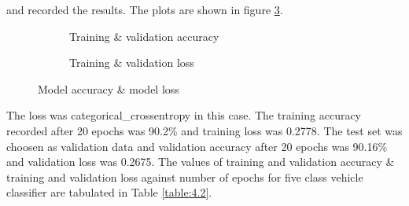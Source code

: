 and recorded the results. The plots are shown in
figure \ref{fig:4.6}.
\begin{figure}[htbp]
    \centering
    \begin{subfigure}[t]{0.45\textwidth}
        \caption{Training \& validation accuracy}
        \label{fig:4.4a}
    \end{subfigure}
    \begin{subfigure}[t]{0.45\textwidth}
        \caption{Training \& validation loss}
        \label{fig:4.4b}
    \end{subfigure}
    \caption[]{Model accuracy \& model loss}
    \label{fig:4.6}
  \end{figure}
  The loss was categorical\_crossentropy in this case. 
  The training accuracy recorded after 20 epochs was 90.2\% and training
  loss was 0.2778. The test set was choosen as validation data and
  validation accuracy after 20 epochs 
  was 90.16\% and validation loss was 0.2675.
  The values of training
  and validation accuracy \& training and validation loss
  against number of epochs for five class vehicle classifier
  are tabulated in Table \ref{table:4.2}.

